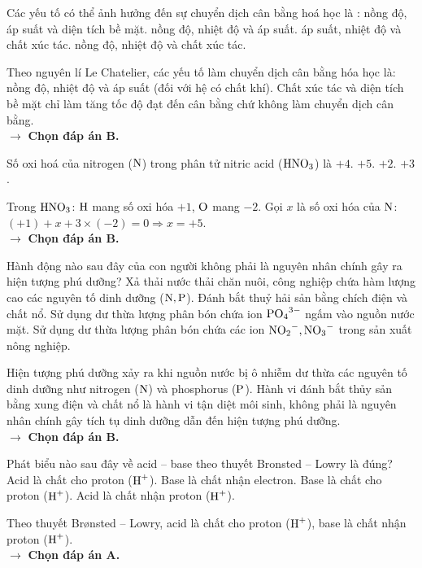 \documentclass[11pt,a4paper]{article}
\begin{document}
\begin{ex}%
Các yếu tố có thể ảnh hưởng đến sự chuyển dịch cân bằng hoá học là :
\choice
{nồng độ, áp suất và diện tích bề mặt.}
{\True nồng độ, nhiệt độ và áp suất.}
{áp suất, nhiệt độ và chất xúc tác.}
{nồng độ, nhiệt độ và chất xúc tác.}
\begin{loigiai}
Theo nguyên lí Le Chatelier, các yếu tố làm chuyển dịch cân bằng hóa học là: nồng độ, nhiệt độ và áp suất (đối với hệ có chất khí). Chất xúc tác và diện tích bề mặt chỉ làm tăng tốc độ đạt đến cân bằng chứ không làm chuyển dịch cân bằng.\\
$\rightarrow$ \textbf{Chọn đáp án B.}
\end{loigiai}
\end{ex}

\begin{ex}%
Số oxi hoá của nitrogen ($\ce{N}$) trong phân tử nitric acid ($\ce{HNO3}$) là
\choice
{$+4$.}
{\True $+5$.}
{$+2$.}
{$+3$.}
\begin{loigiai}
Trong $\ce{HNO3}$: $\ce{H}$ mang số oxi hóa $+1$, $\ce{O}$ mang $-2$. Gọi $x$ là số oxi hóa của $\ce{N}$:\\
$(+1) + x + 3 \times (-2) = 0 \Rightarrow x = +5$.\\
$\rightarrow$ \textbf{Chọn đáp án B.}
\end{loigiai}
\end{ex}

\begin{ex}%
Hành động nào sau đây của con người không phải là nguyên nhân chính gây ra hiện tượng phú dưỡng?
\choice
{Xả thải nước thải chăn nuôi, công nghiệp chứa hàm lượng cao các nguyên tố dinh dưỡng ($\ce{N, P}$).}
{\True Đánh bắt thuỷ hải sản bằng chích điện và chất nổ.}
{Sử dụng dư thừa lượng phân bón chứa ion $\ce{PO4^{3-}}$ ngấm vào nguồn nước mặt.}
{Sử dụng dư thừa lượng phân bón chứa các ion $\ce{NO2^-}, \ce{NO3^-}$ trong sản xuất nông nghiệp.}
\begin{loigiai}
Hiện tượng phú dưỡng xảy ra khi nguồn nước bị ô nhiễm dư thừa các nguyên tố dinh dưỡng như nitrogen ($\ce{N}$) và phosphorus ($\ce{P}$). Hành vi đánh bắt thủy sản bằng xung điện và chất nổ là hành vi tận diệt môi sinh, không phải là nguyên nhân chính gây tích tụ dinh dưỡng dẫn đến hiện tượng phú dưỡng.\\
$\rightarrow$ \textbf{Chọn đáp án B.}
\end{loigiai}
\end{ex}

\begin{ex}%
Phát biểu nào sau đây về acid – base theo thuyết Bronsted – Lowry là đúng?
\choice
{\True Acid là chất cho proton ($\ce{H+}$).}
{Base là chất nhận electron.}
{Base là chất cho proton ($\ce{H+}$).}
{Acid là chất nhận proton ($\ce{H+}$).}
\begin{loigiai}
Theo thuyết Brønsted -- Lowry, acid là chất cho proton ($\ce{H+}$), base là chất nhận proton ($\ce{H+}$).\\
$\rightarrow$ \textbf{Chọn đáp án A.}
\end{loigiai}
\end{ex}
\end{document}
